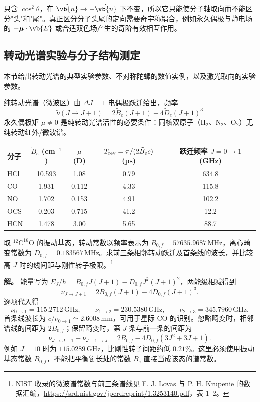 \begin{note}
 只含 \(\cos^2\theta\)，在 \(\hat{\vb{n}}\to-\hat{\vb{n}}\) 下不变，所以它只能使分子轴取向而不能区分"头"和"尾"。真正区分分子头尾的定向需要奇宇称耦合，例如永久偶极与静电场的 \(-\boldsymbol\mu\cdot\vb{E}\) 或合适双色场产生的奇阶有效相互作用。
\end{note}

\subsection{转动光谱实验与分子结构测定}\label{sec:rotation-experiments}

本节给出转动光谱的典型实验参数、不对称陀螺的数值实例，以及激光取向的实验参数。

纯转动光谱（微波区）由 \(\Delta J=1\) 电偶极跃迁给出，频率
\[
\tilde\nu(J\to J+1)=2\tilde B_e(J+1)-4\tilde D_e(J+1)^3
\]
永久偶极矩 \(\mu\ne0\) 是纯转动光谱活性的必要条件：同核双原子（H\(_2\)、N\(_2\)、O\(_2\)）无纯转动红外/微波谱。

\begin{center}
\begin{tabular}{lcccc}
\hline
分子 & \(\tilde B_e\) (cm\(^{-1}\)) & \(\mu\) (D) & \(T_{\rm rev}=\pi/(2\tilde B_ec)\) (ps) & 跃迁频率 \(J=0\to1\) (GHz) \\
\hline
HCl & 10.593 & 1.08 & 0.79 & 634.8 \\
CO & 1.931 & 0.112 & 4.33 & 115.8 \\
NO & 1.702 & 0.153 & 4.91 & 102.2 \\
OCS & 0.203 & 0.715 & 41.2 & 12.2 \\
HCN & 1.478 & 3.00 & 5.65 & 88.7 \\
\hline
\end{tabular}
\end{center}

\begin{exbox}[CO 的纯转动光谱]
取 $^{12}\mathrm C^{16}\mathrm O$ 的振动基态，转动常数以频率表示为
$B_{0,f}=57635.9687\,\mathrm{MHz}$，离心畸变常数为
$D_{0,f}=0.183567\,\mathrm{MHz}$。求前三条相邻转动跃迁及首条线的波长，并比较高 $J$ 时的线间距与刚性转子极限。\footnote{NIST 收录的微波谱常数与前三条谱线见 F. J. Lovas 与 P. H. Krupenie 的数据汇编，\url{https://srd.nist.gov/jpcrdreprint/1.3253140.pdf}，表 1--2。}

\textbf{解。} 能量写为 $E_J/h=B_{0,f}J(J+1)-D_{0,f}J^2(J+1)^2$，两能级相减得到
\[
 \nu_{J\to J+1}=2B_{0,f}(J+1)-4D_{0,f}(J+1)^3.
\]
逐项代入得
\[
 \nu_{0\to1}=115.2712\,\mathrm{GHz},\qquad
 \nu_{1\to2}=230.5380\,\mathrm{GHz},\qquad
 \nu_{2\to3}=345.7960\,\mathrm{GHz}.
\]
首条线波长为 $c/\nu_{0\to1}\simeq2.6008\,\mathrm{mm}$，可用于星际 CO 的识别。忽略畸变时，相邻谱线的间距为 $2B_{0,f}$；保留畸变时，第 $J$ 条与前一条的间距为
\[
 \nu_{J\to J+1}-\nu_{J-1\to J}
 =2B_{0,f}-4D_{0,f}(3J^2+3J+1).
\]
例如 $J=10$ 时为 $115.0289\,\mathrm{GHz}$，比刚性转子间距约低 $0.21\%$。这里必须使用振动基态常数 $B_{0,f}$，不能把平衡键长处的常数 $B_e$ 直接当成该态的谱常数。
\end{exbox}

